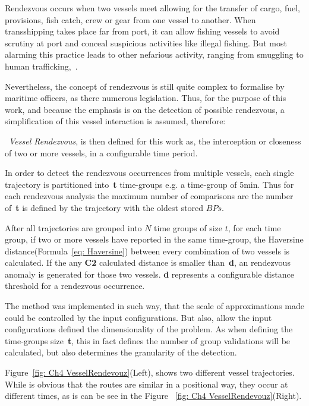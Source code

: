 Rendezvous occurs when two vessels meet allowing for the transfer of cargo, fuel, provisions, fish catch, crew or gear from one vessel to another. When transshipping takes place far from port, it can allow fishing vessels to avoid scrutiny at port and conceal suspicious activities like illegal fishing. But most alarming this practice leads to other nefarious activity, ranging from smuggling to human trafficking,~\cite{Miller2018IdentifyingBehavior}.

Nevertheless, the concept of rendezvous is still quite complex to formalise by maritime officers, as there numerous legislation. Thus, for the purpose of this work, and because the emphasis is on the detection of possible rendezvous, a simplification of this vessel interaction is assumed, therefore: 

~\emph{Vessel Rendezvous}, is then defined for this work as, the interception or closeness of two or more vessels, in a configurable time period.


In order to detect the rendezvous occurrences from multiple vessels, each single trajectory is partitioned into~\textbf{t} time-groups e.g. a time-group of 5min. Thus for each rendezvous analysis the maximum number of comparisons are the number of~\textbf{t} is defined by the trajectory with the oldest stored $BPs$.  

After all trajectories are grouped into $N$ time groups of size $t$, for each time group, if two or more vessels have reported in the same time-group, the Haversine distance(Formula~\ref{eq: Haversine}) between every combination of two vessels is calculated. If the any \textbf{C2} calculated distance is smaller than~\textbf{d}, an rendezvous anomaly is generated for those two vessels. \textbf{d} represents a configurable distance threshold for a rendezvous occurrence.

The method was implemented in such way, that the scale of approximations made could be controlled by the input configurations. But also, allow the input configurations defined the dimensionality of the problem. As when defining the time-groups size~\textbf{t}, this in fact defines the number of group validations will be calculated, but also determines the granularity of the detection.

Figure~\ref{fig:  Ch4 VesselRendevouz}(Left), shows two different vessel trajectories. While is obvious that the routes are similar in a positional way, they occur at different times, as is can be see in the Figure ~\ref{fig: Ch4 VesselRendevouz}(Right).

